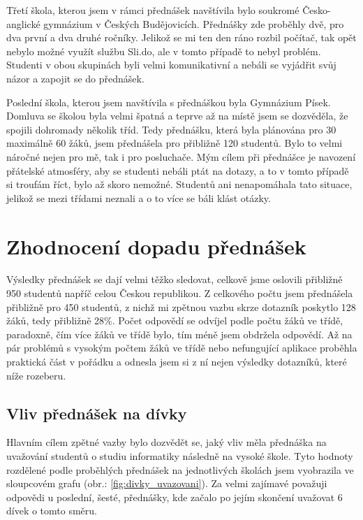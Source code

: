 \documentclass[12pt]{report}			%
\begin{document}
                Třetí škola, kterou jsem v rámci přednášek navštívila bylo soukromé Česko-anglické gymnázium v Českých Budějovicích. Přednášky zde proběhly dvě, pro dva první a dva druhé ročníky. Jelikož se mi ten den ráno rozbil počítač, tak opět nebylo možné využít službu Sli.do, ale v tomto případě to nebyl problém. Studenti v obou skupinách byli velmi komunikativní a nebáli se vyjádřit svůj názor a zapojit se do přednášek. 

                Poslední škola, kterou jsem navštívila s přednáškou byla Gymnázium Písek. Domluva se školou byla velmi špatná a teprve až na místě jsem se dozvěděla, že spojili dohromady několik tříd. Tedy přednášku, která byla plánována pro 30 maximálně 60 žáků, jsem přednášela pro přibližně 120 studentů. Bylo to velmi náročné nejen pro mě, tak i pro posluchače. Mým cílem při přednášce je navození přátelské atmosféry, aby se studenti nebáli ptát na dotazy, a to v tomto případě si troufám říct, bylo až skoro nemožné. Studentů ani nenapomáhala tato situace, jelikož se mezi třídami neznali a o to více se báli klást otázky.
            
                
        \section {Zhodnocení dopadu přednášek}
            Výsledky přednášek se dají velmi těžko sledovat, celkově jsme oslovili přibližně 950 studentů napříč celou Českou republikou. Z celkového počtu jsem přednášela přibližně pro 450 studentů, z nichž mi zpětnou vazbu skrze dotazník poskytlo 128 žáků, tedy přibližně 28\%. Počet odpovědí se odvíjel podle počtu žáků ve třídě, paradoxně, čím více žáků ve třídě bylo, tím méně jsem obdržela odpovědí. Až na pár problémů s vysokým počtem žáků ve třídě nebo nefungující aplikace proběhla praktická část v pořádku a odnesla jsem si z ní nejen výsledky dotazníků, které níže rozeberu.

            \subsection{Vliv přednášek na dívky}
                
                Hlavním cílem zpětné vazby bylo dozvědět se, jaký vliv měla přednáška na uvažování studentů o studiu informatiky následně na vysoké škole. Tyto hodnoty rozdělené podle proběhlých přednášek na jednotlivých školách jsem vyobrazila ve sloupcovém grafu (obr.: \ref{fig:divky_uvazovani}). Za velmi zajímavé považuji odpovědi u poslední, šesté, přednášky, kde začalo po jejím skončení uvažovat 6 dívek o tomto směru. 
                
\end{document}
